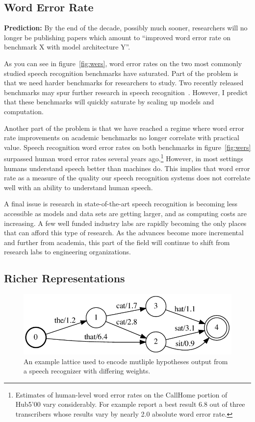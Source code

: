 \subsection{Word Error Rate}
\label{sec:wer}

{\bf Prediction:} By the end of the decade, possibly much sooner, researchers
will no longer be publishing papers which amount to ``improved word error rate
on benchmark X with model architecture Y''.

As you can see in figure~\ref{fig:wers}, word error rates on the two most
commonly studied speech recognition benchmarks have saturated. Part of the
problem is that we need harder benchmarks for researchers to study.  Two
recently released benchmarks may spur further research in speech
recognition~\citep{chen2021gigaspeech, galvez2021people}. However, I predict
that these benchmarks will quickly saturate by scaling up models and
computation.

Another part of the problem is that we have reached a regime where word error
rate improvements on academic benchmarks no longer correlate with practical
value. Speech recognition word error rates on both benchmarks in
figure~\ref{fig:wers} surpassed human word error rates several years
ago.\footnote{Estimates of human-level word error rates on the CallHome portion
of Hub5'00 vary considerably. For example \citet{saon2017english} report a best
result 6.8 out of three transcribers whose results vary by nearly 2.0 absolute
word error rate.} However, in most settings humans understand speech better
than machines do. This implies that word error rate as a measure of the quality
our speech recognition systems does not correlate well with an ability to
understand human speech.

A final issue is research in state-of-the-art speech recognition is becoming
less accessible as models and data sets are getting larger, and as computing
costs are increasing. A few well funded industry labs are rapidly becoming the
only places that can afford this type of research. As the advances become more
incremental and further from academia, this part of the field will continue to
shift from research labs to engineering organizations.

\subsection{Richer Representations}

\begin{figure}
\centering
\includegraphics[width=\linewidth]{figures/lattice}
\caption{An example lattice used to encode mutliple hypotheses output from a
    speech recognizer with differing weights.}
\label{fig:lattice}
\end{figure}

